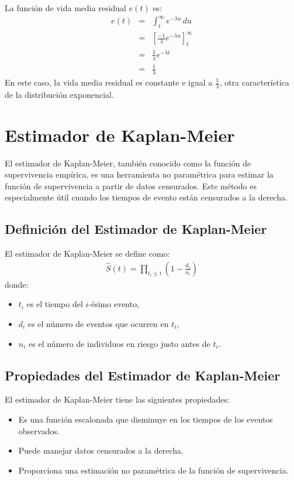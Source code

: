 \documentclass[a4paper]{report} %
\begin{document}
La funci\'on de vida media residual $e(t)$ es:
\begin{eqnarray*}
e(t) &=& \int_t^\infty e^{-\lambda u} \, du \\
     &=& \left[ \frac{-1}{\lambda} e^{-\lambda u} \right]_t^\infty \\
     &=& \frac{1}{\lambda} e^{-\lambda t} \\
     &=& \frac{1}{\lambda}
\end{eqnarray*}
En este caso, la vida media residual es constante e igual a $\frac{1}{\lambda}$, otra caracter\'istica de la distribuci\'on exponencial.


\chapter{Estimador de Kaplan-Meier}

El estimador de Kaplan-Meier, tambi\'en conocido como la funci\'on de supervivencia emp\'irica, es una herramienta no param\'etrica para estimar la funci\'on de supervivencia a partir de datos censurados. Este m\'etodo es especialmente \'util cuando los tiempos de evento est\'an censurados a la derecha.

\section*{Definici\'on del Estimador de Kaplan-Meier}
El estimador de Kaplan-Meier se define como:
\begin{eqnarray*}
\hat{S}(t) = \prod_{t_i \leq t} \left(1 - \frac{d_i}{n_i}\right)
\end{eqnarray*}
donde:
\begin{itemize}
    \item $t_i$ es el tiempo del $i$-\'esimo evento,
    \item $d_i$ es el n\'umero de eventos que ocurren en $t_i$,
    \item $n_i$ es el n\'umero de individuos en riesgo justo antes de $t_i$.
\end{itemize}

\section*{Propiedades del Estimador de Kaplan-Meier}
El estimador de Kaplan-Meier tiene las siguientes propiedades:
\begin{itemize}
    \item Es una funci\'on escalonada que disminuye en los tiempos de los eventos observados.
    \item Puede manejar datos censurados a la derecha.
    \item Proporciona una estimaci\'on no param\'etrica de la funci\'on de supervivencia.
\end{itemize}
\end{document}
